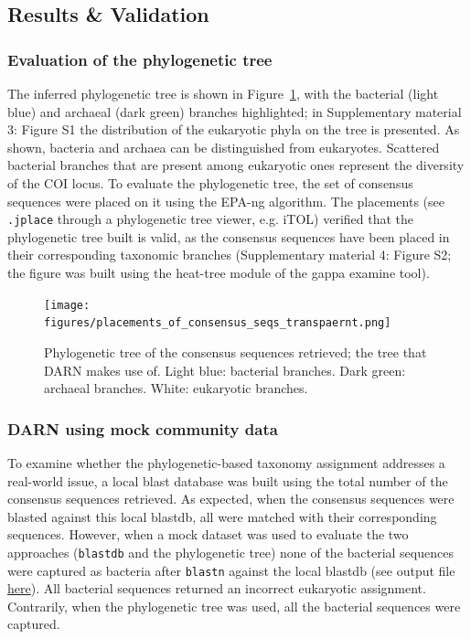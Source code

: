    \subsection{Results \& Validation}
   \subsubsection*{Evaluation of the phylogenetic tree}

   The inferred phylogenetic tree is shown in Figure~\ref{fig:darn-ref-placements}, with the bacterial (light blue) and archaeal (dark green) branches highlighted;
   in Supplementary material 3: Figure S1 the distribution of the eukaryotic phyla on the tree is presented. 
   As shown, bacteria and archaea can be distinguished from eukaryotes. 
   Scattered bacterial branches that are present among eukaryotic ones represent the diversity of the COI locus. 
   To evaluate the phylogenetic tree, the set of consensus sequences were placed on it using the EPA-ng algorithm. 
   The placements (see \texttt{.jplace} through a phylogenetic tree viewer, e.g. iTOL) verified that the phylogenetic tree built is valid, as the consensus sequences have been placed in their corresponding taxonomic branches (Supplementary material 4: Figure S2; the figure was built using the heat-tree module of the gappa examine tool).

   \begin{figure}[h]
      \centering
      \texttt{[image: figures/placements\_of\_consensus\_seqs\_transpaernt.png]}
      \caption[Placements of the consensus COI sequences on the reference COI tree]{
         Phylogenetic tree of the consensus sequences retrieved; the tree that DARN makes use of. Light blue: bacterial branches. 
         Dark green: archaeal branches. White: eukaryotic branches.
      }
      \label{fig:darn-ref-placements}
   \end{figure}


\newpage
   \subsubsection*{DARN using mock community data}

   To examine whether the phylogenetic-based taxonomy assignment addresses a real-world issue, a local blast database was built using the total number of the consensus sequences retrieved. 
   As expected, when the consensus sequences were blasted against this local blastdb, all were matched with their corresponding sequences. 
   However, when a mock dataset was used to evaluate the two approaches (\texttt{blastdb} and the phylogenetic tree) none of the bacterial sequences were captured as bacteria after \texttt{blastn} against the local blastdb (see output file \href{https://github.com/hariszaf/darn/blob/pfam/evaluation/consensus_blast_assignments.txt}{here}). 
   All bacterial sequences returned an incorrect eukaryotic assignment. 
   Contrarily, when the phylogenetic tree was used, all the bacterial sequences were captured.
